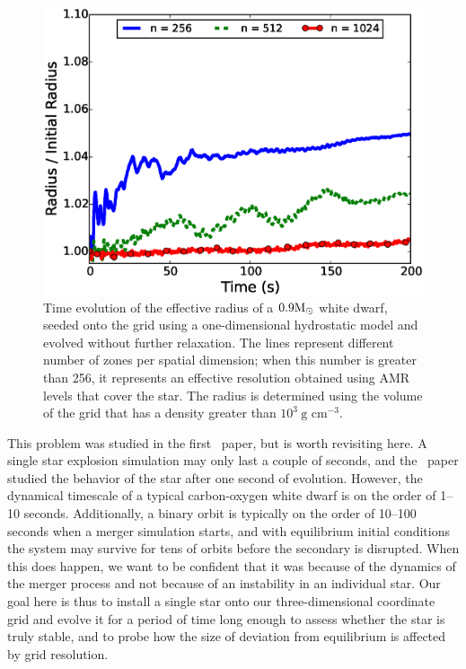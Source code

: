 \documentclass[12pt]{article}
\begin{document}
\begin{figure}[h!]
  \centering
  \includegraphics[scale=0.8,trim=0.15in 0.0in 0.55in 0.5in,clip]{plots/single_star_static_1e3_radius}
  \caption[Effective radius evolution of a static white dwarf]
          {Time evolution of the effective radius of a $0.9 \mathrm{M}_\odot$ 
           white dwarf, seeded onto the grid using a one-dimensional hydrostatic
           model and evolved without further relaxation. The lines represent 
           different number of zones per spatial dimension; when this number is 
           greater than 256, it represents an effective resolution obtained 
           using AMR levels that cover the star. The radius is determined 
           using the volume of the grid that has a density greater than $10^3\ \text{g cm}^{-3}.$
           \label{fig:single_star_static_radius}}
\end{figure}

This problem was studied in the first \castro\ paper, but is worth
revisiting here. A single star explosion simulation may only last a
couple of seconds, and the \castro\ paper studied the behavior of the
star after one second of evolution. However, the dynamical timescale
of a typical carbon-oxygen white dwarf is on the order of 1--10
seconds. Additionally, a binary orbit is typically on the order of
10--100 seconds when a merger simulation starts, and with equilibrium
initial conditions the system may survive for tens of orbits before
the secondary is disrupted. When this does happen, we want to be
confident that it was because of the dynamics of the merger process
and not because of an instability in an individual star. Our goal here
is thus to install a single star onto our three-dimensional
coordinate grid and evolve it for a period of time long enough to
assess whether the star is truly stable, and to probe how the size of
deviation from equilibrium is affected by grid resolution.
\end{document}
